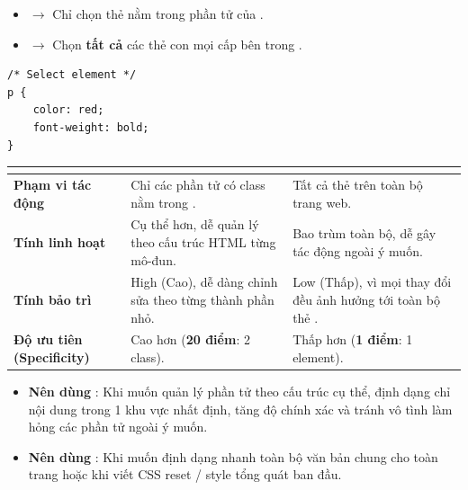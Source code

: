 \begin{noteBox}
\begin{itemize}[leftmargin=1.5em, itemsep=2pt, parsep=0pt]
    \item {} $\rightarrow$ Chỉ chọn thẻ  nằm trong phần tử  của .
    \item {} $\rightarrow$ Chọn \textbf{tất cả} các thẻ con mọi cấp bên trong .
\end{itemize}
\end{noteBox}

\begin{codeWindow}
\begin{lstlisting}[language=CSS3]
/* Select element */
p {
    color: red;
    font-weight: bold;
}
\end{lstlisting}
\end{codeWindow}

\begin{prettyTableBox}
\sffamily\small
\begin{tabularx}{\linewidth}{|>{\bfseries\color{primaryBlue}}K{3.0cm}|Z|Z|}
\hline
{}  &  &  \\
\hline
Phạm vi tác động & Chỉ các phần tử có class  nằm trong . & Tất cả thẻ  trên toàn bộ trang web. \\
\hline
Tính linh hoạt & Cụ thể hơn, dễ quản lý theo cấu trúc HTML từng mô-đun. & Bao trùm toàn bộ, dễ gây tác động ngoài ý muốn. \\
\hline
Tính bảo trì & High (Cao), dễ dàng chỉnh sửa theo từng thành phần nhỏ. & Low (Thấp), vì mọi thay đổi đều ảnh hưởng tới toàn bộ thẻ . \\
\hline
Độ ưu tiên (Specificity) & Cao hơn (\textbf{20 điểm}: 2 class). & Thấp hơn (\textbf{1 điểm}: 1 element). \\
\hline
\end{tabularx}
\end{prettyTableBox}

\begin{tipBox}
\begin{itemize}[leftmargin=1.5em, itemsep=3pt, parsep=0pt]
    \item \textbf{Nên dùng }: Khi muốn quản lý phần tử theo cấu trúc cụ thể, định dạng chỉ nội dung trong 1 khu vực nhất định, tăng độ chính xác và tránh vô tình làm hỏng các phần tử ngoài ý muốn.
    \item \textbf{Nên dùng }: Khi muốn định dạng nhanh toàn bộ văn bản chung cho toàn trang hoặc khi viết CSS reset / style tổng quát ban đầu.
\end{itemize}
\end{tipBox}

